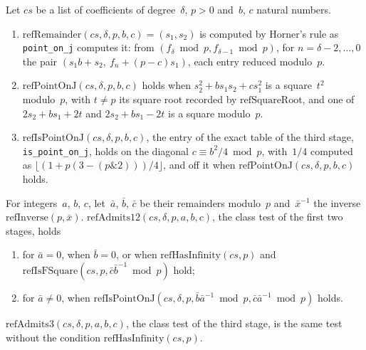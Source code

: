 \begin{definition}\label{def:refPointOnJ}
  \leanok
  Let $\mathit{cs}$ be a list of coefficients of degree~$\delta$, $p > 0$ and~$b$, $c$ natural
  numbers.
  \begin{enumerate}
    \item $\mathrm{refRemainder}(\mathit{cs}, \delta, p, b, c) = (s_1, s_2)$ is computed by Horner's
      rule as \texttt{point\_on\_j} computes it: from $(f_\delta \bmod p, f_{\delta - 1} \bmod p)$,
      for $n = \delta - 2, \ldots, 0$ the pair $(s_1 b + s_2,\ f_n + (p - c) s_1)$, each entry
      reduced modulo~$p$.
    \item $\mathrm{refPointOnJ}(\mathit{cs}, \delta, p, b, c)$ holds when
      $s_2^2 + b s_1 s_2 + c s_1^2$ is a square~$t^2$ modulo~$p$, with $t \ne p$ its square root
      recorded by $\mathrm{refSquareRoot}$, and one of $2 s_2 + b s_1 + 2 t$ and
      $2 s_2 + b s_1 - 2 t$ is a square modulo~$p$.
    \item $\mathrm{refIsPointOnJ}(\mathit{cs}, \delta, p, b, c)$, the entry of the exact table of
      the third stage, \texttt{is\_point\_on\_j}, holds on the diagonal $c \equiv b^2 / 4 \bmod p$,
      with~$1/4$ computed as $\lfloor (1 + p (3 - (p \mathbin{\&} 2))) / 4 \rfloor$, and off it when
      $\mathrm{refPointOnJ}(\mathit{cs}, \delta, p, b, c)$ holds.
  \end{enumerate}
\end{definition}

\begin{definition}\label{def:refAdmits12}
  \leanok
  For integers~$a$, $b$, $c$, let~$\bar a$, $\bar b$, $\bar c$ be their remainders modulo~$p$
  and~$\bar x^{-1}$ the inverse $\mathrm{refInverse}(p, \bar x)$.
  $\mathrm{refAdmits12}(\mathit{cs}, \delta, p, a, b, c)$, the class test of the first two stages,
  holds
  \begin{enumerate}
    \item for $\bar a = 0$, when $\bar b = 0$, or when $\mathrm{refHasInfinity}(\mathit{cs}, p)$ and
      $\mathrm{refIsFSquare}(\mathit{cs}, p, \bar c \bar b^{-1} \bmod p)$ hold;
    \item for $\bar a \ne 0$, when
      $\mathrm{refIsPointOnJ}(\mathit{cs}, \delta, p, \bar b \bar a^{-1} \bmod p, \bar c \bar a^{-1}
      \bmod p)$ holds.
  \end{enumerate}
  $\mathrm{refAdmits3}(\mathit{cs}, \delta, p, a, b, c)$, the class test of the third stage, is the
  same test without the condition $\mathrm{refHasInfinity}(\mathit{cs}, p)$.
\end{definition}

